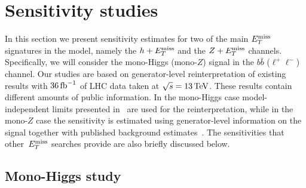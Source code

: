 \section{Sensitivity studies}
\label{sec:sensitivitystudies}

In this section we present sensitivity estimates for two of the main $E_T^\mathrm{miss}$ signatures in the \hdma model, namely the $h +E_T^\mathrm{miss}$  and the $Z+E_T^\mathrm{miss}$ channels. Specifically, we will consider the mono-Higgs (mono-$Z$) signal in the $b \bar b$ ($\ell^+ \ell^-$) channel. Our studies are based on generator-level reinterpretation of existing results with  $36 \, {\rm fb}^{-1}$ of LHC data taken at $\sqrt{s} = 13 \, {\rm TeV}$. These results contain different amounts of public information. In the mono-Higgs case model-independent limits presented in~\cite{Aaboud:2017yqz} are used for the reinterpretation, while in the mono-$Z$ case  the sensitivity is estimated using generator-level information on the signal together with published background estimates~\cite{Aaboud:2017bja}. The sensitivities that other~$E_T^\mathrm{miss}$ searches provide are also briefly discussed below.  

\subsection{Mono-Higgs study}
\label{sec:sensi_monohbb}

